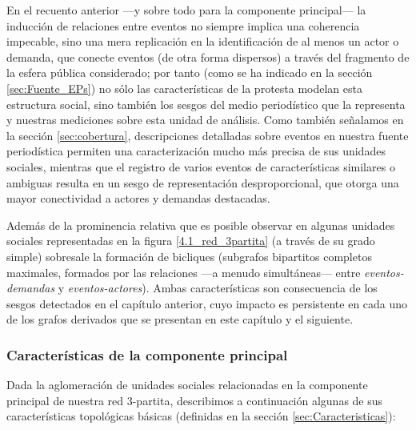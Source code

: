 \documentclass[letterpaper, 11pt]{book}
\theoremstyle{definition}
\theoremstyle{remark}
\begin{document}
En el recuento anterior ---y sobre todo para la componente principal--- la inducción de relaciones entre eventos no siempre implica una coherencia impecable, sino una mera replicación en la identificación de al menos un actor o demanda, que conecte eventos (de otra forma dispersos) a través del fragmento de la esfera pública considerado; por tanto (como se ha indicado en la sección \ref{sec:Fuente_EPs}) no sólo las características de la protesta modelan esta estructura social, sino también los sesgos del medio periodístico que la representa y nuestras mediciones sobre esta unidad de análisis. 
Como también señalamos en la sección \ref{sec:cobertura}, descripciones detalladas sobre eventos en nuestra fuente periodística permiten una caracterización mucho más precisa de sus unidades sociales, mientras que el registro de varios eventos de características similares o ambiguas resulta en un sesgo de representación desproporcional, que otorga una mayor conectividad a actores y demandas destacadas. 


Además de la prominencia relativa que es posible observar en algunas unidades sociales representadas en la figura \ref{4.1_red_3partita} (a través de su grado simple) sobresale la formación de bicliques (subgrafos bipartitos completos maximales, formados por las relaciones ---a menudo simultáneas--- entre \emph{eventos-demandas} y \emph{eventos-actores}). 
Ambas características son consecuencia de los sesgos detectados en el capítulo anterior, cuyo impacto es persistente en cada uno de los grafos derivados que se presentan en este capítulo y el siguiente. 



\subsubsection{Características de la componente principal}
\label{subsubsec:Características_Cppal}

Dada la aglomeración de unidades sociales relacionadas en la componente principal de nuestra red 3-partita, describimos a continuación algunas de sus características topológicas básicas (definidas en la sección \ref{sec:Caracteristicas}): 
\end{document}
